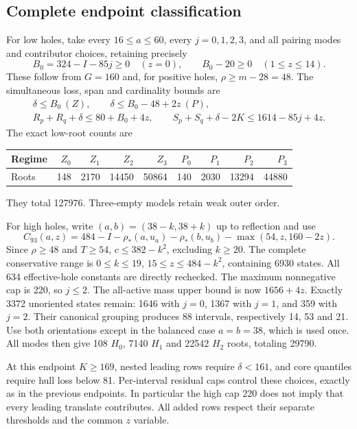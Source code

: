 \documentclass[11pt,a4paper]{article}
\theoremstyle{remark}
\begin{document}
\subsection{Complete endpoint classification}
For low holes, take every $16\le a\le60$, every $j=0,1,2,3$, and all
pairing modes and contributor choices, retaining precisely
\[
 B_0=324-I-85j\ge0\quad(z=0),\qquad
 B_0-20\ge0\quad(1\le z\le14).
\]
These follow from $G=160$ and, for positive holes, $\rho\ge m-28=48$.
The simultaneous loss, span and cardinality bounds are
\begin{gather*}
 \delta\le B_0\ (Z),\qquad\delta\le B_0-48+2z\ (P),\\
 R_p+R_q+\delta\le80+B_0+4z,\qquad
 S_p+S_q+\delta-2K\le1614-85j+4z.
\end{gather*}
The exact low-root counts are
\begin{center}\small
\begin{tabular}{lrrrrrrrr}
\toprule
Regime&$Z_0$&$Z_1$&$Z_2$&$Z_3$&$P_0$&$P_1$&$P_2$&$P_3$\\\midrule
Roots&148&2170&14450&50864&140&2030&13294&44880\\\bottomrule
\end{tabular}
\end{center}
They total 127976. Three-empty models retain weak outer order.

For high holes, write $(a,b)=(38-k,38+k)$ up to reflection and use
\[
 C_{93}(a,z)=484-I-\rho_*(a,u_a)-\rho_*(b,u_b)
                        -\max(54,z,160-2z).
\]
Since $\rho\ge48$ and $T\ge54$, $c\le382-k^2$, excluding $k\ge20$.
The complete conservative range is
$0\le k\le19$, $15\le z\le484-k^2$, containing 6930 states.
All 634 effective-hole constants are directly rechecked.
The maximum nonnegative cap is 220, so $j\le2$.
The all-active mass upper bound is now $1656+4z$.
Exactly 3372 unoriented states remain: 1646 with $j=0$, 1367 with $j=1$,
and 359 with $j=2$. Their canonical grouping produces 88 intervals,
respectively 14, 53 and 21. Use both orientations except in the balanced
case $a=b=38$, which is used once. All modes then give 108 $H_0$,
7140 $H_1$ and 22542 $H_2$ roots, totaling 29790.

At this endpoint $K\ge169$, nested leading rows require
$\delta<161$, and core quantiles require hull loss below 81.
Per-interval residual caps control these choices, exactly as in the
previous endpoints. In particular the high cap 220 does not imply
that every leading translate contributes. All added rows respect
their separate thresholds and the common $z$ variable.
\end{document}
